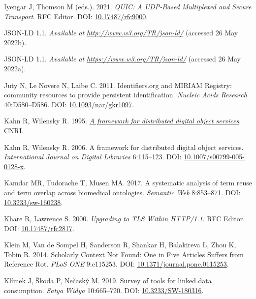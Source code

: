 \begin{CSLReferences}{1}{0}
\leavevmode{}%
Iyengar J, Thomson M (eds.). 2021. \emph{QUIC: A UDP-Based Multiplexed and Secure Transport}. RFC Editor. DOI: \href{https://doi.org/10.17487/rfc9000}{10.17487/rfc9000}.

\leavevmode{}%
JSON-LD 1.1. \emph{Available at} \href{http://www.w3.org/TR/json-ld/}{\emph{http://www.w3.org/TR/json-ld/}} (accessed 26 May 2022b).

\leavevmode{}%
JSON-LD 1.1. \emph{Available at} \href{https://www.w3.org/TR/json-ld/}{\emph{https://www.w3.org/TR/json-ld/}} (accessed 26 May 2022a).

\leavevmode{}%
Juty N, Le Novere N, Laibe C. 2011. Identifiers.org and MIRIAM Registry: community resources to provide persistent identification. \emph{Nucleic Acids Research} 40:D580--D586. DOI: \href{https://doi.org/10.1093/nar/gkr1097}{10.1093/nar/gkr1097}.

\leavevmode{}%
Kahn R, Wilensky R. 1995. \emph{\href{http://www.cnri.reston.va.us/k-w.html}{A framework for distributed digital object services}}. CNRI.

\leavevmode{}%
Kahn R, Wilensky R. 2006. A framework for distributed digital object services. \emph{International Journal on Digital Libraries} 6:115--123. DOI: \href{https://doi.org/10.1007/s00799-005-0128-x}{10.1007/s00799-005-0128-x}.

\leavevmode{}%
Kamdar MR, Tudorache T, Musen MA. 2017. A systematic analysis of term reuse and term overlap across biomedical ontologies. \emph{Semantic Web} 8:853--871. DOI: \href{https://doi.org/10.3233/sw-160238}{10.3233/sw-160238}.

\leavevmode{}%
Khare R, Lawrence S. 2000. \emph{Upgrading to TLS Within HTTP/1.1}. RFC Editor. DOI: \href{https://doi.org/10.17487/rfc2817}{10.17487/rfc2817}.

\leavevmode{}%
Klein M, Van de Sompel H, Sanderson R, Shankar H, Balakireva L, Zhou K, Tobin R. 2014. Scholarly Context Not Found: One in Five Articles Suffers from Reference Rot. \emph{PLoS ONE} 9:e115253. DOI: \href{https://doi.org/10.1371/journal.pone.0115253}{10.1371/journal.pone.0115253}.

\leavevmode{}%
Klímek J, Škoda P, Nečaský M. 2019. Survey of tools for linked data consumption. \emph{Satya Widya} 10:665--720. DOI: \href{https://doi.org/10.3233/SW-180316}{10.3233/SW-180316}.


\end{CSLReferences}
